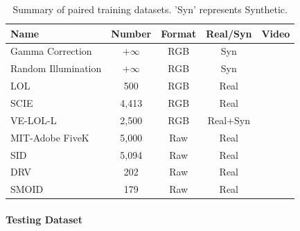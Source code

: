 \documentclass[letterpaper,12pt]{article}
\begin{document}
	\begin{table}[!htbp]
		\centering
		\tiny
			\begin{tabular}{>{\centering\arraybackslash}m{2.5cm}|c|c|c|c}
				
				\hline
				
				\textbf{Name} & \textbf{Number} & \textbf{Format} & \textbf{Real/Syn} & \textbf{Video} \\
				
				\hline
				
				Gamma Correction & $+\infty$ & RGB & Syn & \\
				
				Random Illumination & $+\infty$ & RGB & Syn & \\
				
				\hline
				
				LOL\cite{wei2018deep} & 500 & RGB & Real & \\
				
				SCIE\cite{cai2018learning} & 4,413 & RGB & Real & \\
				
				VE-LOL-L\cite{jiang2019learning} & 2,500 & RGB & Real+Syn & \\
				
				MIT-Adobe FiveK\cite{bychkovsky2011learning} & 5,000 & Raw & Real & \\
				
				SID\cite{wei2018deep} & 5,094 & Raw & Real & \\
				
				DRV\cite{chen2019seeing} & 202 & Raw & Real & \checkmark  \\
				
				SMOID\cite{jiang2019learning} & 179 & Raw & Real & \checkmark  \\
				
				\hline
				
			\end{tabular}
		\captionsetup{font=scriptsize} %
		\caption{\label{tab: Paired_training_datases}
			Summary of paired training datasets. 'Syn' represents Synthetic.} %
		
	\end{table}
	
	\paragraph{Testing Dataset} \qquad
	
\end{document}
